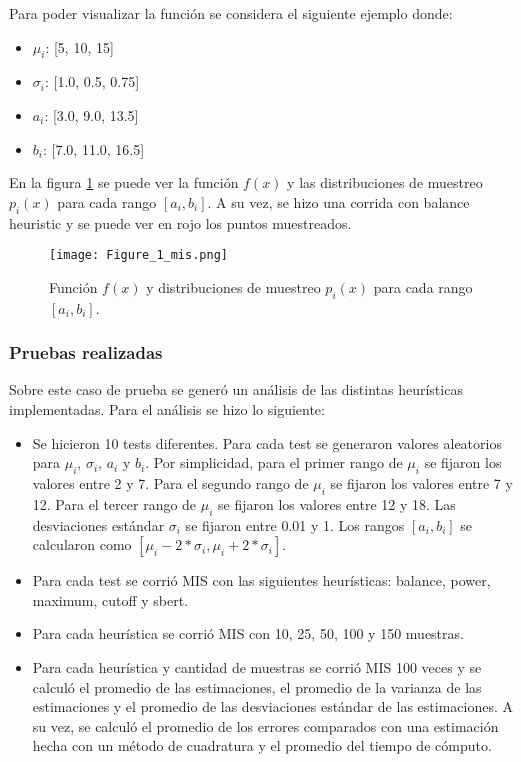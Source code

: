 \documentclass{article}
\begin{document}
Para poder visualizar la función se considera el siguiente ejemplo donde:

\begin{itemize}
    \item \textbf{\( \mu_{i} \)}: [5, 10, 15]
    \item \textbf{\( \sigma_{i} \)}: [1.0, 0.5, 0.75]
    \item \textbf{\( a_{i} \)}: [3.0, 9.0, 13.5]
    \item \textbf{\( b_{i} \)}: [7.0, 11.0, 16.5]
\end{itemize}

En la figura \ref{fig:mis1} se puede ver la función \( f(x) \) y las distribuciones de muestreo \( p_{i}(x) \) para cada rango \( [a_{i}, b_{i}] \).
A su vez, se hizo una corrida con balance heuristic y se puede ver en rojo los puntos muestreados.

\begin{figure}[H]
\texttt{[image: Figure\_1\_mis.png]}
\caption{Función \( f(x) \) y distribuciones de muestreo \( p_{i}(x) \) para cada rango \( [a_{i}, b_{i}] \).}
\label{fig:mis1}
\end{figure}

\subsubsection{Pruebas realizadas}

Sobre este caso de prueba se generó un análisis de las distintas heurísticas implementadas.
Para el análisis se hizo lo siguiente:
\begin{itemize}
    \item Se hicieron 10 tests diferentes. Para cada test se generaron valores aleatorios para \( \mu_{i} \), \( \sigma_{i} \), \( a_{i} \) y \( b_{i} \).
          Por simplicidad, para el primer rango de  \( \mu_{i} \) se fijaron los valores entre 2 y 7.
          Para el segundo rango de \( \mu_{i} \) se fijaron los valores entre 7 y 12.
          Para el tercer rango de \( \mu_{i} \) se fijaron los valores entre 12 y 18.
          Las desviaciones estándar \( \sigma_{i} \) se fijaron entre 0.01 y 1.
          Los rangos \( [a_{i}, b_{i}] \) se calcularon como \( [ \mu_{i} - 2 * \sigma_{i}, \mu_{i} + 2 * \sigma_{i} ] \).
    \item Para cada test se corrió MIS con las siguientes heurísticas: balance, power, maximum, cutoff y sbert.
    \item Para cada heurística se corrió MIS con 10, 25, 50, 100 y 150 muestras.
    \item Para cada heurística y cantidad de muestras se corrió MIS 100 veces y se calculó el promedio de las estimaciones,
          el promedio de la varianza de las estimaciones y el promedio de las desviaciones estándar de las estimaciones.
          A su vez, se calculó el promedio de los errores comparados con una estimación hecha con un método de cuadratura y el promedio del tiempo de cómputo.
\end{itemize}
\end{document}
